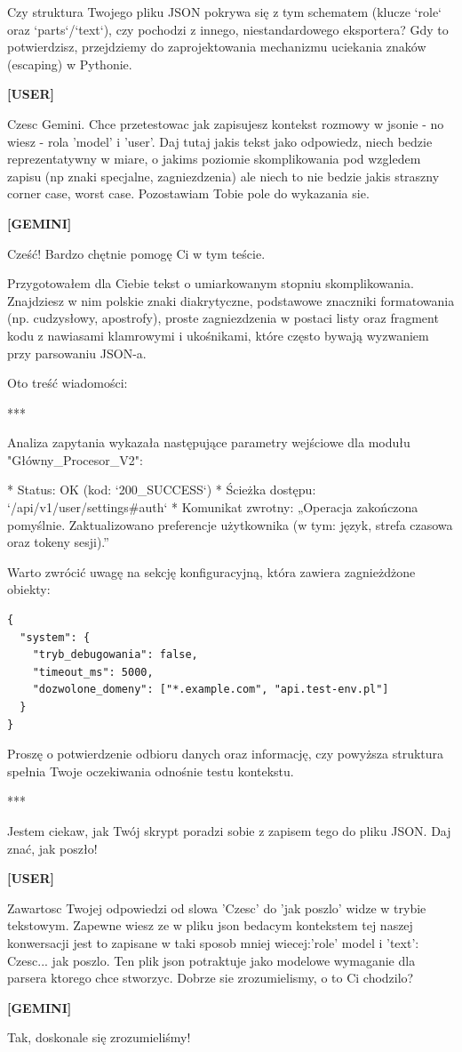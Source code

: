 \documentclass[10pt,a4paper]{article}
\newcommand{\UserTurn}{\textbf{[USER]}\par\medskip}
\newcommand{\ModelTurn}{\textbf{[GEMINI]}\par\medskip}
\newcommand{\Separator}{\par\vspace{4pt}\noindent{\color{rulecolor}\rule{\linewidth}{0.4pt}}\par\vspace{6pt}}
\begin{document}
Czy struktura Twojego pliku JSON pokrywa się z tym schematem (klucze `role` oraz `parts`/`text`), czy pochodzi z innego, niestandardowego eksportera? Gdy to potwierdzisz, przejdziemy do zaprojektowania mechanizmu uciekania znaków (escaping) w Pythonie.
\Separator
\UserTurn
Czesc Gemini. Chce przetestowac jak zapisujesz kontekst rozmowy w jsonie - no wiesz - rola 'model' i 'user'. Daj tutaj jakis tekst jako odpowiedz, niech bedzie reprezentatywny w miare, o jakims poziomie skomplikowania pod wzgledem zapisu (np  znaki specjalne, zagniezdzenia) ale niech to nie bedzie  jakis straszny corner case, worst case. Pozostawiam Tobie pole do wykazania sie.
\Separator
\ModelTurn
Cześć! Bardzo chętnie pomogę Ci w tym teście. 

Przygotowałem dla Ciebie tekst o umiarkowanym stopniu skomplikowania. Znajdziesz w nim polskie znaki diakrytyczne, podstawowe znaczniki formatowania (np. cudzysłowy, apostrofy), proste zagniezdzenia w postaci listy oraz fragment kodu z nawiasami klamrowymi i ukośnikami, które często bywają wyzwaniem przy parsowaniu JSON-a.

Oto treść wiadomości:

***

Analiza zapytania wykazała następujące parametry wejściowe dla modułu "Główny\_Procesor\_V2":

* Status: OK (kod: `200\_SUCCESS`)
* Ścieżka dostępu: `/api/v1/user/settings\#auth`
* Komunikat zwrotny: „Operacja zakończona pomyślnie. Zaktualizowano preferencje użytkownika (w tym: język, strefa czasowa oraz tokeny sesji).”

Warto zwrócić uwagę na sekcję konfiguracyjną, która zawiera zagnieżdżone obiekty:
\begin{verbatim}
{
  "system": {
    "tryb_debugowania": false,
    "timeout_ms": 5000,
    "dozwolone_domeny": ["*.example.com", "api.test-env.pl"]
  }
}
\end{verbatim}

Proszę o potwierdzenie odbioru danych oraz informację, czy powyższa struktura spełnia Twoje oczekiwania odnośnie testu kontekstu.

***

Jestem ciekaw, jak Twój skrypt poradzi sobie z zapisem tego do pliku JSON. Daj znać, jak poszło!
\Separator
\UserTurn
Zawartosc Twojej odpowiedzi od slowa 'Czesc' do 'jak poszlo' widze w trybie tekstowym. Zapewne wiesz ze w pliku json bedacym kontekstem tej naszej konwersacji jest to zapisane w taki sposob mniej wiecej:'role' model i 'text': Czesc... jak poszlo. Ten plik json potraktuje jako modelowe wymaganie dla parsera ktorego chce stworzyc. Dobrze sie zrozumielismy, o to Ci chodzilo?
\Separator
\ModelTurn
Tak, doskonale się zrozumieliśmy! 
\end{document}
